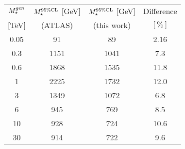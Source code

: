 \begin{table}[!htbp]
\centering
\begin{tabular}{c|c|c|c}
 \hline
 \hline
 $M_{\star}^{\tiny gen}$ & $M_{\star}^{95\%\mathrm{CL}}$ [GeV] & $M_{\star}^{95\%\mathrm{CL}}$ [GeV] & Difference \\
 $[$TeV$]$ & (ATLAS) & (this work) & $[\%]$ \\
 \hline


0.05 & 91 & 89 & 2.16 \\
0.3 & 1151 & 1041 & 7.3 \\
0.6 & 1868 & 1535 & 11.8 \\
1 & 2225 & 1732 & 12.0 \\
3 & 1349 & 1072 & 6.8 \\
6 & 945 & 769 & 8.5 \\
10 & 928 & 724 & 10.6 \\
30 & 914 & 722 & 9.6 \\




\end{tabular}
\end{table}
